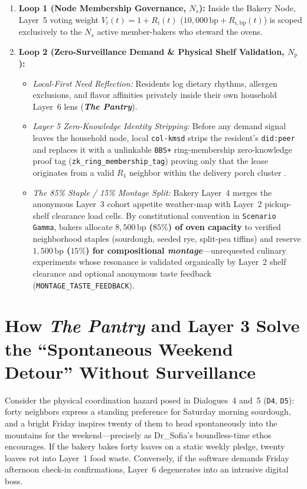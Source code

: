 \begin{enumerate}
    \item \textbf{Loop 1 (Node Membership Governance, $N_s$):} Inside the Bakery Node, Layer~5 voting weight $V_i(t) = 1 + R_i(t)$ ($10{,}000\,\mathrm{bp} + R_{i,\mathrm{bp}}(t)$) is scoped exclusively to the $N_s$ active member-bakers who steward the ovens.
    \item \textbf{Loop 2 (Zero-Surveillance Demand \& Physical Shelf Validation, $N_p$):}
    \begin{itemize}
        \item \textit{Local-First Need Reflection:} Residents log dietary rhythms, allergen exclusions, and flavor affinities privately inside their own household Layer~6 lens (\textbf{\textit{The Pantry}}).
        \item \textit{Layer 5 Zero-Knowledge Identity Stripping:} Before any demand signal leaves the household node, local \texttt{col-kmsd} strips the resident's \texttt{did:peer} and replaces it with a unlinkable \texttt{BBS+} ring-membership zero-knowledge proof tag (\texttt{zk\_ring\_membership\_tag}) proving only that the lease originates from a valid $R_1$ neighbor within the delivery porch cluster \parencite{camenisch2004signature,naacp1958}.
        \item \textit{The 85\% Staple / 15\% Montage Split:} Bakery Layer~4 merges the anonymous Layer~3 cohort appetite weather-map with Layer~2 pickup-shelf clearance load cells. By constitutional convention in \texttt{Scenario Gamma}, bakers allocate \textbf{$8{,}500\,\mathrm{bp}$ ($85\%$) of oven capacity} to verified neighborhood staples (sourdough, seeded rye, split-pea tiffins) and reserve \textbf{$1{,}500\,\mathrm{bp}$ ($15\%$) for compositional \textit{montage}}---unrequested culinary experiments whose resonance is validated organically by Layer~2 shelf clearance and optional anonymous taste feedback (\texttt{MONTAGE\_TASTE\_FEEDBACK}).
    \end{itemize}
\end{enumerate}

\section{How \textit{The Pantry} and Layer 3 Solve the ``Spontaneous Weekend Detour'' Without Surveillance}
\label{sec:ch4-weekend-detour}

Consider the physical coordination hazard posed in Dialogues~4 and~5 (\texttt{D4}, \texttt{D5}): forty neighbors express a standing preference for Saturday morning sourdough, and a bright Friday inspires twenty of them to head spontaneously into the mountains for the weekend---precisely as Dr\_Sofia's boundless-time ethos encourages. If the bakery bakes forty loaves on a static weekly pledge, twenty loaves rot into Layer~1 food waste. Conversely, if the software demands Friday afternoon check-in confirmations, Layer~6 degenerates into an intrusive digital boss.


